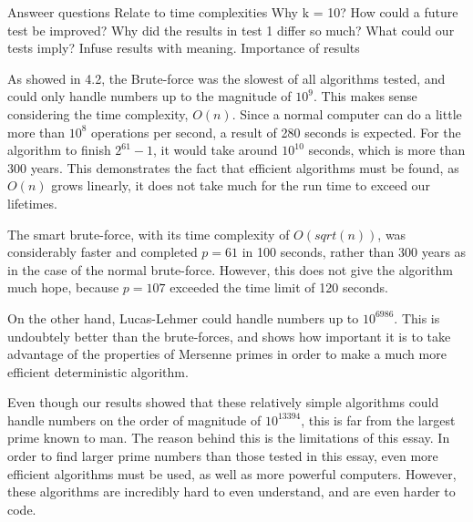 \documentclass[main.tex]{subfiles}
\begin{document}
Answeer questions
Relate to time complexities
Why k = 10?
How could a future test be improved?
Why did the results in test 1 differ so much?
What could our tests imply?
Infuse results with meaning.
Importance of results

As showed in 4.2, the Brute-force was the slowest of all algorithms tested, and
could only handle numbers up to the magnitude of $10^{9}$. This makes sense
considering the time complexity, $O(n)$. Since a normal computer can do a little
more than $10^{8}$ operations per second, a result of 280 seconds is expected.
For the algorithm to finish $2^{61}-1$, it would take around $10^{10}$ seconds,
which is more than 300 years. This demonstrates the fact that efficient
algorithms must be found, as $O(n)$ grows linearly, it does not take much for
the run time to exceed our lifetimes.

The smart brute-force, with its time complexity of $O(sqrt(n))$, was
considerably faster and completed $p=61$ in 100 seconds, rather than 300 years
as in the case of the normal brute-force. However, this does not give the
algorithm much hope, because $p=107$ exceeded the time limit of 120 seconds.

On the other hand, Lucas-Lehmer could handle numbers up to $10^{6986}$. This is
undoubtely better than the brute-forces, and shows how important it is to take
advantage of the properties of Mersenne primes in order to make a much more
efficient deterministic algorithm.

Even though our results showed that these relatively simple algorithms could
handle numbers on the order of magnitude of $10^{13394}$, this is far from the
largest prime known to man. The reason behind this is the limitations of this
essay. In order to find larger prime numbers than those tested in this essay,
even more efficient algorithms must be used, as well as more powerful computers.
However, these algorithms are incredibly hard to even understand, and are even
harder to code.

 
\end{document}

